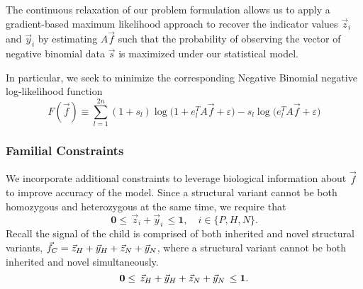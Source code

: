 The continuous relaxation of our problem formulation allows us to apply a gradient-based maximum likelihood approach to recover the indicator values $\vec{z}_i$ and $\vec{y}_i$ by estimating $A \vec{f}$ such that the probability of observing the vector of negative binomial data $\vec{s}$ is maximized under our statistical model. 

In particular, we seek to minimize the corresponding Negative Binomial negative log-likelihood function
\begin{equation} \label{negBin_negativeLogLikehihood}
	F(\vec{f}) \equiv \sum_{l=1}^{2n}  (1 + s_l)\log \big(1+ e_l^T A \vec{f} + \varepsilon \big) - s_l \log \big( e_l^T A \vec{f} + \varepsilon \big)
\end{equation}

\subsubsection{Familial Constraints}
We incorporate additional constraints to leverage biological information about $\vec{f}$ to improve accuracy of the model. Since a structural variant cannot be both homozygous and heterozygous at the same time, we require that 
\begin{equation*}
	\mathbf{0} \leq \, \vec{z}_i + \vec{y}_i \, \leq \mathbf{1}, \quad i \in \{P,H,N\}.
\end{equation*}
Recall the signal of the child is comprised of both inherited and novel structural variants, $\vec{f}_C = \vec{z}_H + \vec{y}_H + \vec{z}_N + \vec{y}_N$, where a structural variant cannot be both inherited and novel simultaneously. 
\begin{equation*}
	\mathbf{0} \leq \, \vec{z}_H + \vec{y}_H + \vec{z}_N + \vec{y}_N \, \leq \mathbf{1}.
\end{equation*} 

